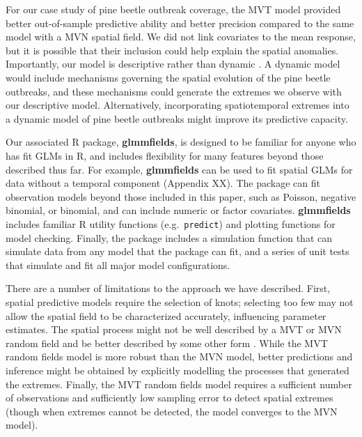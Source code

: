 \documentclass[12pt,english]{article}
\begin{document}
\begin{spacing}{1.9}
For our case study of pine beetle outbreak coverage, the MVT model provided
better out-of-sample predictive ability and better precision compared to the same model
with a MVN spatial field. We did not link covariates to the mean response, but it is
possible that their inclusion could help explain the spatial anomalies. Importantly,
our model is descriptive rather than dynamic \citep{cressie2011}.
A dynamic model would include mechanisms governing the spatial evolution of the
pine beetle outbreaks, and these mechanisms could generate the extremes we
observe with our descriptive model. Alternatively, incorporating spatiotemporal
extremes into a dynamic model of pine beetle outbreaks might improve its
predictive capacity.

Our associated R package, \textbf{glmmfields}, is designed to be familiar for
anyone who has fit GLMs in R, and includes flexibility for many features beyond
those described thus far. For example, \textbf{glmmfields} can be used to fit
spatial GLMs for data without a temporal component (Appendix XX). The package
can fit observation models beyond those included in this paper, such as Poisson,
negative binomial, or binomial, and can include numeric or factor covariates.
\textbf{glmmfields} includes familiar R utility functions (e.g.\
\texttt{predict}) and plotting functions for model checking. Finally, the
package includes a simulation function that can simulate data from any model
that the package can fit, and a series of unit tests that simulate and fit all
major model configurations.

There are a number of limitations to the approach we have described. First,
spatial predictive models require the selection of knots; selecting too few may
not allow the spatial field to be characterized accurately, influencing
parameter estimates. The spatial process might not be well described by a MVT or
MVN random field and be better described by some other form
\citep[e.g.][]{conn2015}. While the MVT random fields model is more robust than
the MVN model, better predictions and inference might be obtained by explicitly
modelling the processes that generated the extremes. Finally, the MVT random
fields model requires a sufficient number of observations and sufficiently low
sampling error to detect spatial extremes (though when extremes cannot be
detected, the model converges to the MVN model).


\end{spacing}
\end{document}
